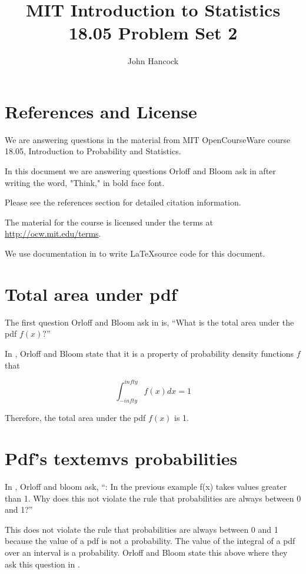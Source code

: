 \documentclass[a4paper,11pt]{article}
\author{John Hancock}
\title{MIT Introduction to Statistics 18.05 Problem Set 2 }
\begin{document}
\maketitle
\tableofcontents
\section{References and License}
We are answering questions in the material from MIT OpenCourseWare
course 18.05, Introduction to Probability and Statistics.

In this document we are answering questions Orloff and Bloom ask in
\cite{reading5b} after writing the word, "Think," in bold face font.

Please see the references section for detailed citation information.

The material for the course is licensed under the terms at
\url{http://ocw.mit.edu/terms}.

We use documentation in \cite{latexIntegrals} to write \LaTeX source code for
this document.

\section{Total area under pdf}

The first question Orloff and Bloom ask in \cite{reading5b} is, ``What is the
total area under the pdf $f \left( x \right)?$''

In \cite{reading5b}, Orloff and Bloom state that it is a property of
probability density functions $f$ that

\begin{equation}
  \int_{-infty}^{infty} {f \left(x \right)} dx = 1
\end{equation}

Therefore, the total area under the pdf $f \left( x \right)$ is 1.

\section{Pdf's textem{vs} probabilities}
In \cite{reading5b}, Orloff and bloom ask, ``: In the previous example f(x)
takes values greater than 1. Why does this not violate the rule that
probabilities are always between 0 and 1?''

This does not violate the rule that probabilities are always between 0 and 1
because the value of a pdf is not a probability.  The value of the integral
of a pdf over an interval is a probability.  Orloff and Bloom state this above
where they ask this question in \cite{reading5b}.
\end{document}
